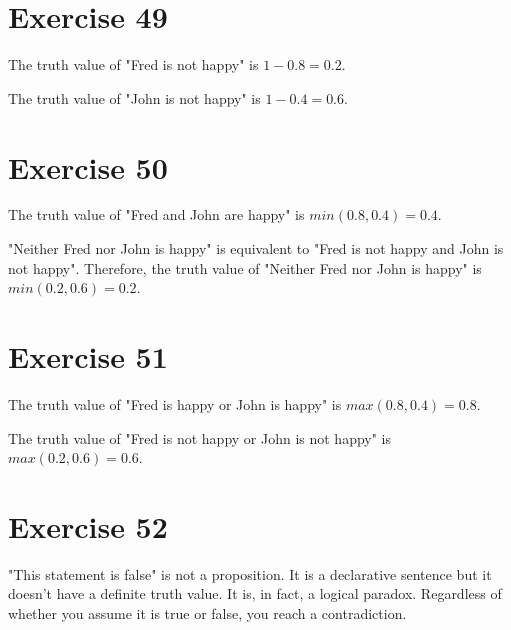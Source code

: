\documentclass{article}
\begin{document}
\pagebreak

\section{Exercise 49}
The truth value of "Fred is not happy" is $1 - 0.8 = 0.2$.

The truth value of "John is not happy" is $1 - 0.4 = 0.6$.

\pagebreak

\section{Exercise 50}
The truth value of "Fred and John are happy" is $min(0.8, 0.4) = 0.4$.

"Neither Fred nor John is happy" is equivalent to "Fred is not happy and John is not happy". Therefore, the truth value of "Neither Fred nor John is happy" is $min(0.2, 0.6) = 0.2$.

\pagebreak

\section{Exercise 51}
The truth value of "Fred is happy or John is happy" is $max(0.8, 0.4) = 0.8$.

The truth value of "Fred is not happy or John is not happy" is $max(0.2, 0.6) = 0.6$.

\pagebreak

\section{Exercise 52}
"This statement is false" is not a proposition.  It is a declarative sentence but it doesn't have a definite truth value.  It is, in fact, a logical paradox. Regardless of whether you assume it is true or false, you reach a contradiction.
\end{document}
